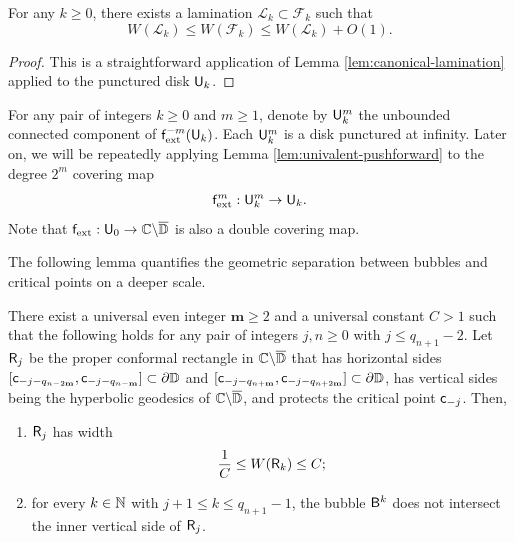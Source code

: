 \documentclass{amsart}
\begin{document}
\begin{lemma}
\label{lem:canonical-lamination-Dk}
    For any $k \geq 0$, there exists a lamination $\mathcal{L}_k \subset \mathcal{F}_k$ such that
    \[
        W(\mathcal{L}_k) \leq W(\mathcal{F}_k) \leq W(\mathcal{L}_k) + O(1).
    \]
\end{lemma}

\begin{proof}
    This is a straightforward application of Lemma \ref{lem:canonical-lamination} applied to the punctured disk $\mathsf{U}_k$.
\end{proof}

For any pair of integers $k \geq 0$ and $m \geq 1$, denote by $\mathsf{U}_k^m$ the unbounded connected component of $\mathsf{f}_{\textnormal{ext}}^{-m}(\mathsf{U}_k)$. 
Each $\mathsf{U}_k^m$ is a disk punctured at infinity. 
Later on, we will be repeatedly applying Lemma \ref{lem:univalent-pushforward} to the degree $2^m$ covering map
\[
    \mathsf{f}_{\textnormal{ext}}^m : \mathsf{U}_k^m \to \mathsf{U}_k.
\]
Note that $\mathsf{f}_{\textnormal{ext}} : \mathsf{U}_0 \to \mathbb{C} \backslash \overline{\mathbb{D}}$ is also a double covering map.

The following lemma quantifies the geometric separation between bubbles and critical points on a deeper scale.

\begin{lemma}
\label{lem:control-critical-pt}
    There exist a universal even integer $\mathbf{m} \geq 2$ and a universal constant $C >1$ such that the following holds
    for any pair of integers $j, n \geq 0$ with $j \leq q_{n+1}-2$. 
    Let $\mathsf{R}_j$ be the proper conformal rectangle in $\mathbb{C} \backslash \overline{\mathbb{D}}$ that has horizontal sides $[\mathsf{c}_{-j-q_{n-2\mathbf{m}}},\mathsf{c}_{-j-q_{n-\mathbf{m}}}] \subset \partial \mathbb{D}$ and $[\mathsf{c}_{-j-q_{n+\mathbf{m}}},\mathsf{c}_{-j-q_{n+2\mathbf{m}}}] \subset \partial \mathbb{D}$, has vertical sides being the hyperbolic geodesics of $\mathbb{C} \backslash \overline{\mathbb{D}}$, and protects the critical point $\mathsf{c}_{-j}$.
    Then,
    \begin{enumerate}[label=\textnormal{(\arabic*)}]
        \item $\mathsf{R}_j$ has width 
        \[
            \frac{1}{C} \leq W(\mathsf{R}_k) \leq C;
        \]
        \item for every $k \in \mathbb{N}$ with $j+1 \leq k \leq q_{n+1}-1$, the bubble $\mathsf{B}^k$ does not intersect the inner vertical side of $\mathsf{R}_j$.
    \end{enumerate}
\end{lemma}
\end{document}
